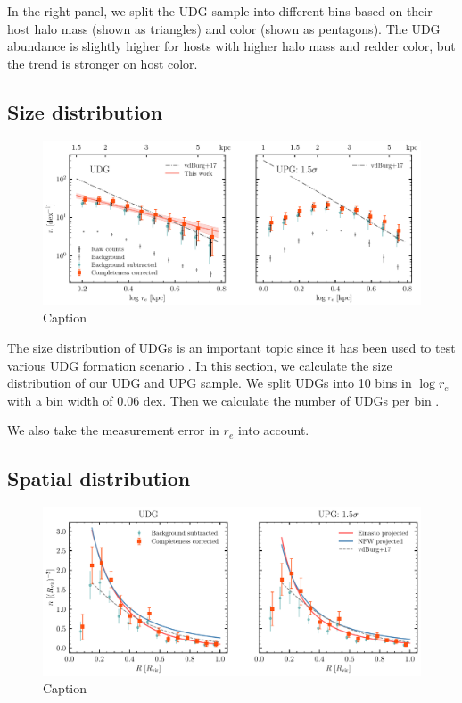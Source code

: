 \documentclass[twocolumn,astrosymb,twocolappendix]{aastex631}
\begin{document}
\begin{CJK*}{UTF8}{gbsn}
In the right panel, we split the UDG sample into different bins based on their host halo mass (shown as triangles) and color (shown as pentagons). The UDG abundance is slightly higher for hosts with higher halo mass and redder color, but the trend is stronger on host color. 



\subsection{Size distribution}
\begin{figure}
	\vbox{ 
		\centering
		\includegraphics[width=1\linewidth]{size_distribution.pdf}
	}
    \caption{Caption}
    \label{fig:size_distribution}
\end{figure}

The size distribution of UDGs is an important topic since it has been used to test various UDG formation scenario \citep[e.g.,][]{Amorisco2016,vdBurg2017}. In this section, we calculate the size distribution of our UDG and UPG sample. We split UDGs into 10 bins in $\log r_e$ with a bin width of 0.06 dex. Then we calculate the number of UDGs per bin . 


We also take the measurement error in $r_e$ into account. 

\subsection{Spatial distribution}



\begin{figure}
	\vbox{ 
		\centering
		\includegraphics[width=1\linewidth]{radial_distribution.pdf}
	}
    \caption{Caption}
    \label{fig:radial_distribution}
\end{figure}



\end{CJK*}
\end{document}

